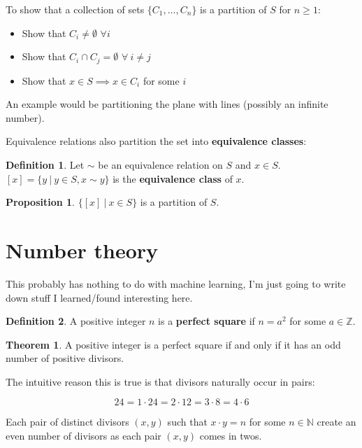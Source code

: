 \documentclass{article}
\theoremstyle{definition}
\newtheorem{definition}{Definition}[section]
\newtheorem{proposition}{Proposition}[section]
\newtheorem{theorem}{Theorem}[section]
\begin{document}
To show that a collection of sets $\{ C_1, \ldots, C_n \}$ is a partition of $S$ for $n \ge 1$:

\begin{itemize}
\item Show that $C_i \neq \emptyset$ $\forall i$
\item Show that $C_i \cap C_j = \emptyset$ $\forall \ i \neq j$
\item Show that $x \in S \implies x \in C_i$ for some $i$
\end{itemize}

An example would be partitioning the plane with lines (possibly an infinite number).

Equivalence relations also partition the set into \textbf{equivalence classes}:

\begin{definition}
Let $\sim$ be an equivalence relation on $S$ and $x \in S$. \\
$[x] = \{ y \ | \ y \in S, x \sim y\}$ is the \textbf{equivalence class} of $x$.
\end{definition}

\begin{proposition}
$\{[x] \ | \ x \in S \}$ is a partition of $S$.
\end{proposition}

\section{Number theory}

This probably has nothing to do with machine learning, I'm just going to write down stuff I learned/found interesting here.

\begin{definition}
A positive integer $n$ is a \textbf{perfect square} if $n = a^2$ for some $a \in \mathbb{Z}$.
\end{definition}

\begin{theorem}
A positive integer is a perfect square if and only if it has an odd number of positive divisors.
\end{theorem}

The intuitive reason this is true is that divisors naturally occur in pairs:

\begin{equation*}
24 = 1 \cdot 24 = 2 \cdot 12 = 3 \cdot 8 = 4 \cdot 6
\end{equation*}

Each pair of distinct divisors $(x, y)$ such that $x \cdot y = n$ for some $n \in \mathbb{N}$ create an even number of divisors as each pair $(x, y)$ comes in twos.
\end{document}
